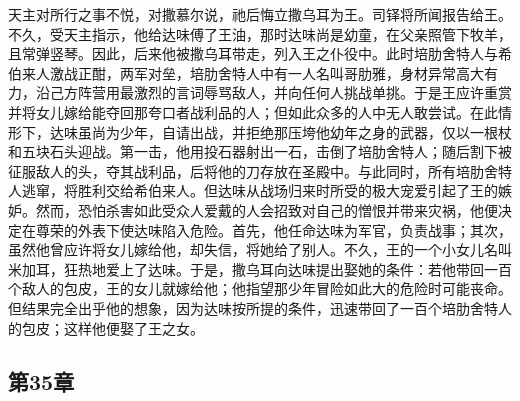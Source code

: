 天主对所行之事不悦，对撒慕尔说，祂后悔立撒乌耳为王。司铎将所闻报告给王。不久，受天主指示，他给达味傅了王油，那时达味尚是幼童，在父亲照管下牧羊，且常弹竖琴。因此，后来他被撒乌耳带走，列入王之仆役中。此时培肋舍特人与希伯来人激战正酣，两军对垒，培肋舍特人中有一人名叫哥肋雅，身材异常高大有力，沿己方阵营用最激烈的言词辱骂敌人，并向任何人挑战单挑。于是王应许重赏并将女儿嫁给能夺回那夸口者战利品的人；但如此众多的人中无人敢尝试。在此情形下，达味虽尚为少年，自请出战，并拒绝那压垮他幼年之身的武器，仅以一根杖和五块石头迎战。第一击，他用投石器射出一石，击倒了培肋舍特人；随后割下被征服敌人的头，夺其战利品，后将他的刀存放在圣殿中。与此同时，所有培肋舍特人逃窜，将胜利交给希伯来人。但达味从战场归来时所受的极大宠爱引起了王的嫉妒。然而，恐怕杀害如此受众人爱戴的人会招致对自己的憎恨并带来灾祸，他便决定在尊荣的外表下使达味陷入危险。首先，他任命达味为军官，负责战事；其次，虽然他曾应许将女儿嫁给他，却失信，将她给了别人。不久，王的一个小女儿名叫米加耳，狂热地爱上了达味。于是，撒乌耳向达味提出娶她的条件：若他带回一百个敌人的包皮，王的女儿就嫁给他；他指望那少年冒险如此大的危险时可能丧命。但结果完全出乎他的想象，因为达味按所提的条件，迅速带回了一百个培肋舍特人的包皮；这样他便娶了王之女。\par


\subsection{第35章}

